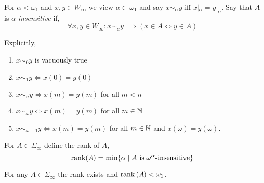 \documentclass[12pt]{article}
\let\oldimplies\implies
\renewcommand{\implies}{\hspace{-1ex} \oldimplies \hspace{-1ex}}
\begin{document}
\begin{defn}
For $\alpha < \omega_1$ and $x, y \in W_{\infty}$ we view $\alpha \subset \omega_1$ and say $x \sim_{\alpha} y$ iff $x|_{\alpha} = y|_{\alpha}$. Say that $A$ is $\alpha$-\textit{insensitive} if,
\[ \forall x, y \in W_{\infty} : x \sim_{\alpha} y \oldimplies (x \in A \iff y \in A) \]
\end{defn}

\begin{rmk}
Explicitly,
\begin{enumerate}
\item $x \sim_0 y$ is vacuously true
\item $x \sim_1 y \iff x(0) = y(0)$
\item $x \sim_n y \iff x(m) = y(m)$ for all $m < n$
\item $x \sim_{\omega} y \iff x(m) = y(m)$ for all $m \in \mathbb{N}$
\item $x \sim_{\omega + 1} y \iff x(m) = y(m)$ for all $m \in \mathbb{N}$ and $x(\omega) = y(\omega)$.
\end{enumerate}
\end{rmk}

\begin{defn}
For $A \in \Sigma_{\infty}$ define the rank of $A$,
\[ \operatorname{\mathrm{rank}}(A) = \min \{ \alpha \mid A \text{ is } \omega^\alpha\text{-insensitive} \} \]
\end{defn}

\begin{prop}
For any $A \in \Sigma_{\infty}$ the rank exists and $\operatorname{\mathrm{rank}}{(A)} < \omega_1$.
\end{prop}
\end{document}
